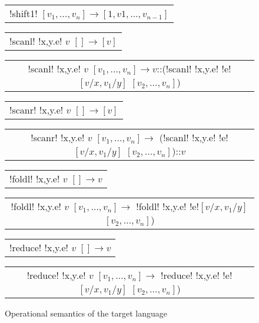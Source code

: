 \begin{figure*}[tb]
    \centering
    \begin{tabular}{c}   
    \\\hline
    !shift1! $[v_1,\ldots,v_n] \to [1,v1,\ldots,v_{n-1}]$
\end{tabular}

\begin{tabular}{c}   
    \\\hline
    !scanl! !x,y.e! $v$ $[] \to [v]$
\end{tabular}

\begin{tabular}{c}   
    \\\hline
    !scanl! !x,y.e! $v$ $[v_1,\ldots,v_n] \to v$::(!scanl! !x,y.e! !e!$[v/x,v_1/y]$ $[v_2,\ldots,v_n]$)
\end{tabular}

\begin{tabular}{c}   
    \\\hline
    !scanr! !x,y.e! $v$ $[] \to [v]$
\end{tabular}

\begin{tabular}{c}   
    \\\hline
    !scanr! !x,y.e! $v$ $[v_1,\ldots,v_n] \to$ (!scanl! !x,y.e! !e!$[v/x,v_1/y]$ $[v_2,\ldots,v_n]$)::$v$
\end{tabular}

\begin{tabular}{c}   
    \\\hline
    !foldl! !x,y.e! $v$ $[] \to v$
\end{tabular}

\begin{tabular}{c}   
    \\\hline
    !foldl! !x,y.e! $v$ $[v_1,\ldots,v_n] \to$ !foldl! !x,y.e! !e!$[v/x,v_1/y]$ $[v_2,\ldots,v_n]$)
\end{tabular}

\begin{tabular}{c}   
    \\\hline
    !reduce! !x,y.e! $v$ $[] \to v$
\end{tabular}

\begin{tabular}{c}   
    \\\hline
    !reduce! !x,y.e! $v$ $[v_1,\ldots,v_n] \to$ !reduce! !x,y.e! !e!$[v/x,v_1/y]$ $[v_2,\ldots,v_n]$)
\end{tabular}

\vspace{-0.2cm}
\caption{Operational semantics of the target language}
\vspace{-0.4cm}
\label{fig:op_semantics_target}
\end{figure*}